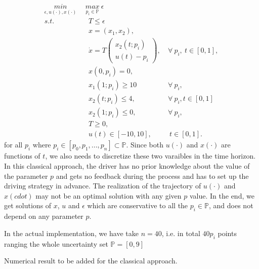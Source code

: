 \documentclass  [
  paper    = a4,
  BCOR     = 10mm,
  twoside,
  fontsize = 12pt,
  fleqn,
  toc      = bibnumbered,
  toc      = listofnumbered,
  numbers  = noendperiod,
  headings = normal,
  listof   = leveldown,
  version  = 3.03
]                                       {scrreprt}
\newcommand{\<}{\langle}
\renewcommand{\>}{\rangle}
\begin{document}
\begin{subequations}
	\begin{align}
		\underset{\epsilon, u(\cdot), x(\cdot)}{min}  \ \   &  \underset{p_i \in \mathbb{P}}{max}  \  \epsilon \\ 
		s.t.  &  \ \ T  \leq \epsilon \\
		&  \ \ x = (x_1, x_2),   \label{ca_rc_x} \\ 
		& \ \  \dot{x} = T  \begin{pmatrix}  x_2(t;p_i) \\ u(t)-p_i   \end{pmatrix}, &  \ \forall \   p_i, \  t \in [0,1],  \label{ca_rc_partial} \\
		& \ \ x(0,p_i) = 0, \label{ca_rc_t0}\\
		& \ \ x_1(1;p_i) \geq 10  & \ \forall \   p_i,   \label{ca_rc_x1_t1} \\
		& \ \ x_2(t;p_i) \leq 4, &   \ \forall \   p_i,  t \in [0,1] \label{ca_rc_x2_tc} \\
		& \ \ x_2(1;p_i) \leq 0,   & \ \forall \   p_i,  \label{ca_rc_x2_t1}  \\
		& \ \ T \geq 0, \\
		& \ \ u(t) \in [-10, 10], & \ \ t \in [0,1]. 
	\end{align}
	\label{ca_rc}
\end{subequations}
for all $p_i$ where $p_i \in [p_0, p_1, ..., p_n] \subset \mathbb{P}$. Since both $u(\cdot)$ and $x(\cdot)$ are functions of $t$, we also needs to discretize these two varaibles in the time horizon. In this classical approach, the driver has no prior knowledge about the value of the parameter $p$ and gets no feedback during the process and has to set up the driving strategy in advance. The realization of the trajectory of $u(\cdot)$ and $x(cdot)$ may not be an optimal solution with any given $p$ value. 
In the end, we get solutions of $x$, $u$ and $ \epsilon$ which are conservative to all the $p_i \in \mathbb{P}$, and does not depend on any parameter $p$. 

In the actual implementation, we have take $n=40$, i.e. in total $40 p_i$ points ranging the whole uncertainty set $\mathbb{P}=[0,9]$ 

Numerical result to be added for the classical approach.  

\end{document}
